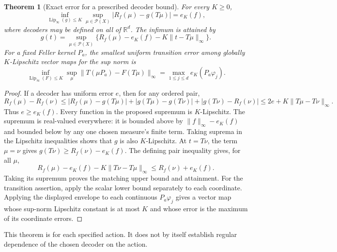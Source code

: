 \documentclass[11pt]{article}
\newtheorem{theorem}{Theorem}
\theoremstyle{definition}
\begin{document}
\begin{theorem}[Exact error for a prescribed decoder bound]
For every $K\geq0$,
\[
 \inf_{\operatorname{Lip}_\infty(g)\leq K}
 \sup_{\mu\in\mathcal P(X)}|R_f(\mu)-g(T\mu)|=e_K(f),
\]
where decoders may be defined on all of $\mathbb R^d$. The infimum is attained
by
\[
 g(t)=\sup_{\mu\in\mathcal P(X)}
       \{R_f(\mu)-e_K(f)-K\|t-T\mu\|_\infty\}.
\]
For a fixed Feller kernel $P_a$, the smallest uniform transition error among
globally $K$-Lipschitz vector maps for the sup norm is
\[
 \inf_{\operatorname{Lip}_\infty(F)\leq K}
 \sup_\mu\|T(\mu P_a)-F(T\mu)\|_\infty
       =\max_{1\leq j\leq d}e_K(P_a\varphi_j).
\]
\end{theorem}
\begin{proof}
If a decoder has uniform error $e$, then for any ordered pair,
\[
 R_f(\mu)-R_f(\nu)
 \leq |R_f(\mu)-g(T\mu)|
        +|g(T\mu)-g(T\nu)|+|g(T\nu)-R_f(\nu)|
 \leq2e+K\|T\mu-T\nu\|_\infty.
\]
Thus $e\geq e_K(f)$. Every function in the proposed supremum is
$K$-Lipschitz. The supremum is real-valued everywhere: it is bounded above
by $\|f\|_\infty-e_K(f)$ and bounded below by any one chosen measure's
finite term. Taking suprema in the Lipschitz inequalities shows that $g$
is also $K$-Lipschitz. At $t=T\nu$, the term $\mu=\nu$ gives
$g(T\nu)\geq R_f(\nu)-e_K(f)$. The defining pair inequality gives, for
all $\mu$,
\[
 R_f(\mu)-e_K(f)-K\|T\nu-T\mu\|_\infty
            \leq R_f(\nu)+e_K(f).
\]
Taking its supremum proves the matching upper bound and attainment.
For the transition assertion, apply the scalar lower bound separately to
each coordinate. Applying the displayed envelope to each continuous
$P_a\varphi_j$ gives a vector map whose sup-norm Lipschitz constant is at
most $K$ and whose error is the maximum of its coordinate errors.
\end{proof}
This theorem is for each specified action. It does not by itself establish
regular dependence of the chosen decoder on the action.
\end{document}
